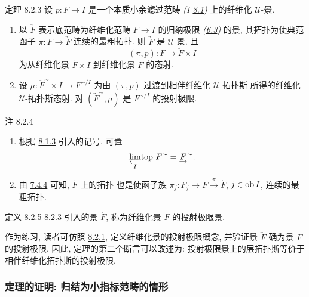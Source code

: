 \begin{enonce*}{定理 8.2.3}
设 $p:F\to I$ 是一个本质小余滤过范畴
\emph{(I \hyperref[I.sec8.1]{8.1})} 上的纤维化 $𝒰$-景.
\begin{enumerate}
\renewcommand{\labelenumi}{\theenumi)}
\item 以 $\underrightarrow{F}$ 表示底范畴为纤维化范畴 $F\to I$ 的归纳极限
\emph{(\hyperref[VI.def6.3]{6.3})} 的景,
其拓扑为使典范函子 $\pi:F\to\underrightarrow{F}$ 连续的最粗拓扑.
则 $\underrightarrow{F}$ 是 $𝒰$-景,
且
$$
(\pi, p) : F \to \underrightarrow{F} \times I
$$
为从纤维化景 $\underrightarrow{F}\times I$ 到纤维化景 $F$ 的态射.

\item 设 $\mu:\underrightarrow{F}^{\sim}\times I\to F^{\sim/I}$
为由 $(\pi,p)$ 过渡到相伴纤维化 $𝒰$-拓扑斯
所得的纤维化 $𝒰$-拓扑斯态射.
对 $(\underrightarrow{F}^{\sim},\mu)$
是 $F^{\sim/I}$ 的投射极限.
\end{enumerate}
\end{enonce*}

\begin{enonce*}[remark]{注 8.2.4}
\begin{enumerate}
\renewcommand{\labelenumi}{\theenumi)}
\item 根据 \hyperref[VI.subsubsec8.1.3]{8.1.3} 引入的记号, 可置
$$
{\displaystyle{\varprojlim_{I}\!\mbox{\rm top }}} F^{\sim} = \underrightarrow{F}^{\sim}.
$$

\item 由 \hyperref[VI.prop7.4.4]{7.4.4} 可知,
$\underrightarrow{F}$ 上的拓扑
也是使函子族 $\pi_j:F_j\to F\xrightarrow{\pi}\underrightarrow{F}$,
$j\in\operatorname{ob} I$, 连续的最粗拓扑.
\end{enumerate}
\end{enonce*}

\begin{enonce*}{定义 8.2.5}
\hyperref[VI.thm8.2.3]{8.2.3} 引入的景 $\underrightarrow{F}$,
称为纤维化景 $F$ 的投射极限景.
\end{enonce*}

作为练习, 读者可仿照 \hyperref[VI.lem8.2.1]{8.2.1},
定义纤维化景的投射极限概念,
并验证景 $\underrightarrow{F}$ 确为景 $F$ 的投射极限.
因此, 定理的第二个断言可以改述为:
投射极限景上的层拓扑斯等价于相伴纤维化拓扑斯的投射极限.

\setcounter{subsubsection}{5}
\subsubsection{定理的证明: 归结为小指标范畴的情形}


